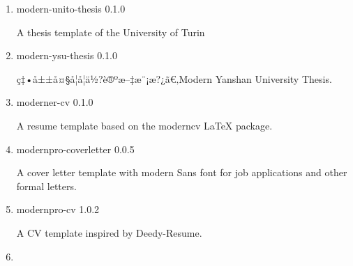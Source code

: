 \begin{enumerate}

  { modern-uit-thesis } { 0.1.2 }

  A Modern Thesis Template in Typst.
\item
  \href{/universe/package/modern-unito-thesis/}{}


  { modern-unito-thesis } { 0.1.0 }

  A thesis template of the University of Turin
\item
  \href{/universe/package/modern-ysu-thesis/}{}


  { modern-ysu-thesis } { 0.1.0 }

  ç‡•å±±å¤§å­¦å­¦ä½?è®ºæ--‡æ¨¡æ?¿ã€‚Modern Yanshan University Thesis.
\item
  \href{/universe/package/moderner-cv/}{}


  { moderner-cv } { 0.1.0 }

  A resume template based on the moderncv LaTeX package.
\item
  \href{/universe/package/modernpro-coverletter/}{}


  { modernpro-coverletter } { 0.0.5 }

  A cover letter template with modern Sans font for job applications and
  other formal letters.
\item
  \href{/universe/package/modernpro-cv/}{}


  { modernpro-cv } { 1.0.2 }

  A CV template inspired by Deedy-Resume.
\item
  \href{/universe/package/modpattern/}{}


\end{enumerate}

